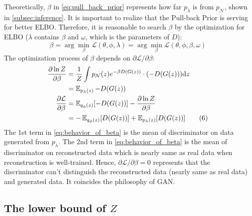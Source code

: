 Theoretically, $\beta$ in \cref{eq:pull_back_prior} represents how far $p_\lambda$ is from $p_\mathcal{N}$, shown in \cref{subsec:inference}.
It is important to realize that the Pull-back Prior is serving for better ELBO. 
Therefore, it is reasonable to search $\beta$ by the optimization for ELBO ($\lambda$ contains $\beta$ and $\omega$, which is the parameters of $D$):
\begin{equation}
	\beta = \arg \min_{\beta} \mathcal{L}(\theta, \phi, \lambda) = \arg \min_{\beta} \mathcal{L}(\theta, \phi, \beta, \omega) \tag{5}
\end{equation}
The optimization process of $\beta$ depends on $\partial \mathcal{L}/\partial \beta$:
\begin{align*}\label{eq:behavior_of_beta}
\frac{\partial \ln Z}{\partial \beta} &= \frac{1}{Z} \int p_\mathcal{N}(z) e^{-\beta D(G(z))} \cdot (-D(G(z))) \mathrm{d} z \\
&=  \operatorname{\mathbb{E}}_{p_\lambda(z)} - D(G(z))  \\
\frac{\partial \mathcal{L}}{\partial \beta} &= \operatorname{\mathbb{E}}_{q_\phi(z)}[ -D(G(z))] - \frac{\partial \ln Z}{\partial \beta} \\
&= - \operatorname{\mathbb{E}}_{q_\phi(z)}[ D(G(z))] + \operatorname{\mathbb{E}}_{p_\lambda(z)}[ D(G(z))]   \tag{6}
\end{align*}
The 1st term in \cref{eq:behavior_of_beta} is the mean of discriminator on data generated from $p_\lambda$. The 2nd term in \cref{eq:behavior_of_beta} is the mean of discriminator on reconstructed data which is nearly same as real data when reconstruction is well-trained. Hence, $\partial \mathcal{L}/\partial \beta = 0$ represents that the discriminator can't distinguish the reconstructed data (nearly same as real data) and generated data. It coincides the philosophy of GAN.

\subsection{The lower bound of $Z$}\label{subsec:determine_z}

